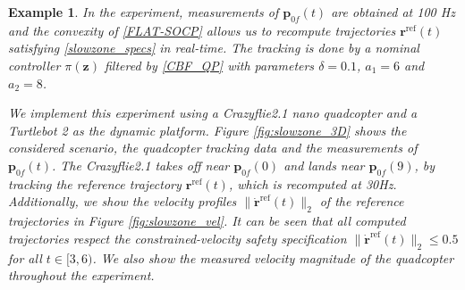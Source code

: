 \documentclass[journal,10pt]{IEEEtran}
\newtheorem{example}{\bfseries Example}%
\newcommand{\vect}[1]{\boldsymbol{\mathbf{#1}}}
\newif\ifdraft
\newcommand{\XX}[1]{\ifdraft{\color{red}[{\bf XX}: #1]}\fi}
\newcommand{\VF}[1]{\ifdraft{\color{blue}[{\bf VF}: #1]}\fi}
\begin{document}
\begin{example}
In the experiment, measurements of $\vect{p}_{0f}(t)$ are obtained at 100 Hz and the convexity of \eqref{FLAT-SOCP} allows us to recompute trajectories $\vect{r}^{\text{ref}}(t)$ satisfying \eqref{slowzone_specs} in real-time. The tracking is done by a nominal controller $\pi(\vect{z})$ filtered by \eqref{CBF_QP} with parameters $\delta = 0.1$, $a_1 = 6$ and $a_2 = 8$.


We implement this experiment using a Crazyflie2.1 nano quadcopter and a Turtlebot 2 as the dynamic platform. Figure \ref{fig:slowzone_3D} shows the considered scenario, the quadcopter tracking data and the measurements of $\vect{p}_{0f}(t)$.
The Crazyflie2.1 takes off near $\vect{p}_{0f}(0)$ and lands near $\vect{p}_{0f}(9)$, by tracking the reference trajectory $\vect{r}^{\text{ref}}(t)$, which is recomputed at 30Hz. Additionally, we show the velocity profiles $\|\dot{\vect{r}}^{\text{ref}}(t)\|_2$ of the reference trajectories in Figure \ref{fig:slowzone_vel}. It can be seen that all computed trajectories respect the constrained-velocity safety specification $\|\dot{\vect{r}}^{\text{ref}}(t)\|_2\leq 0.5$ for all $t\in[3,6)$. We also show the measured velocity magnitude of the quadcopter throughout the experiment.



\end{example}
\end{document}
